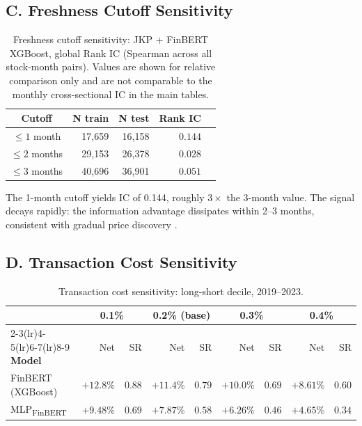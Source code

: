 \subsection*{C. Freshness Cutoff Sensitivity}
\label{app:fresh}

\begin{table}[H]
\centering
\caption{Freshness cutoff sensitivity: JKP + FinBERT XGBoost, global Rank IC (Spearman across all stock-month pairs). Values are shown for relative comparison only and are not comparable to the monthly cross-sectional IC in the main tables.}
\label{tab:freshness}
\begin{tabular}{crrrr}
\toprule
\textbf{Cutoff} & \textbf{N train} & \textbf{N test} & \textbf{Rank IC} \\
\midrule
$\leq 1$ month  & 17{,}659 & 16{,}158 & $\mathbf{0.144}$ \\
$\leq 2$ months & 29{,}153 & 26{,}378 & $0.028$ \\
$\leq 3$ months & 40{,}696 & 36{,}901 & $0.051$ \\
\bottomrule
\end{tabular}
\end{table}

The 1-month cutoff yields IC of 0.144, roughly $3\times$ the 3-month value. The signal decays rapidly: the information advantage dissipates within 2--3 months, consistent with gradual price discovery \cite{hong2000}.

\subsection*{D. Transaction Cost Sensitivity}
\label{app:costs}

\begin{table}[H]
\centering
\caption{Transaction cost sensitivity: long-short decile, 2019--2023.}
\label{tab:costs}
\setlength{\tabcolsep}{7pt}
\begin{tabular}{lrrrrrrrr}
\toprule
 & \multicolumn{2}{c}{\textbf{0.1\%}} & \multicolumn{2}{c}{\textbf{0.2\% (base)}} & \multicolumn{2}{c}{\textbf{0.3\%}} & \multicolumn{2}{c}{\textbf{0.4\%}} \\
\cmidrule(lr){2-3}\cmidrule(lr){4-5}\cmidrule(lr){6-7}\cmidrule(lr){8-9}
\textbf{Model} & Net & SR & Net & SR & Net & SR & Net & SR \\
\midrule
FinBERT (XGBoost)  & $+12.8\%$ & $0.88$ & $+11.4\%$ & $0.79$ & $+10.0\%$ & $0.69$ & $+8.61\%$ & $0.60$ \\
MLP\textsubscript{FinBERT} & $+9.48\%$ & $0.69$ & $+7.87\%$ & $0.58$ & $+6.26\%$ & $0.46$ & $+4.65\%$ & $0.34$ \\
\bottomrule
\end{tabular}
\end{table}

